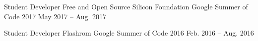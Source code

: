 
\begin{cventries}

\cventry
	{Student Developer} %
	{Free and Open Source Silicon Foundation} %
	{Google Summer of Code 2017} %
	{May 2017 -- Aug. 2017} %
	{\begin{cvitems} %
		\item {}
	\end{cvitems}}

\cventry
	{Student Developer} %
	{Flashrom} %
	{Google Summer of Code 2016} %
	{Feb. 2016 -- Aug. 2016} %
	{\begin{cvitems} %
		\item {}
	\end{cvitems}}

\end{cventries}
